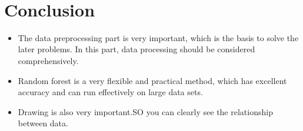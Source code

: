 
	
\ 


\section{Conclusion}
\begin{itemize}
 \item The data preprocessing part is very important, which is the basis to solve the later problems. In this part, data processing should be considered comprehensively.
 \item Random forest is a very flexible and practical method, which has excellent accuracy and can run effectively on large data sets.
 \item Drawing is also very important.SO you can clearly see the relationship between data.
\end{itemize}










